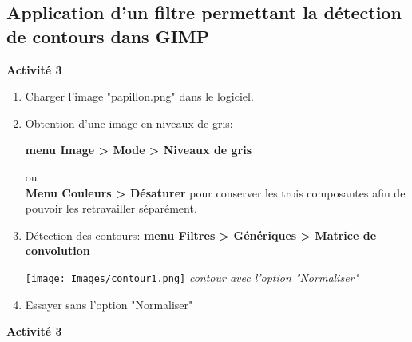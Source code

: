 \documentclass[10pt,fleqn]{article} %
\begin{document}
\subsection{Application d’un filtre permettant la détection de contours dans GIMP}

\vspace{0.3cm}

\textbf{Activité 3}

\vspace{0.2cm}

\begin{enumerate}
	\item 
	
	Charger l'image "papillon.png"  dans le logiciel.
	
	\medskip
	
	
	\item 
	Obtention d’une image en niveaux de gris:
	
	\medskip
	
	 \textbf{menu Image > Mode > Niveaux de gris} 
	 
	 \medskip
	 
	 ou \\
	 
	 \textbf{Menu Couleurs > Désaturer} pour conserver les trois composantes afin de pouvoir les retravailler séparément.
	 
	 \medskip
	
	\item  Détection des contours: \textbf{menu Filtres > Génériques > Matrice de convolution}
	
	

\begin{center}
	
	\texttt{[image: Images/contour1.png]}
	{\textit{contour avec l'option "Normaliser"}}
	
\end{center}

\item Essayer sans l'option "Normaliser"

\end{enumerate}

\textbf{Activité 3}


\vspace{0.4cm}
	\medskip
	
\end{document}
